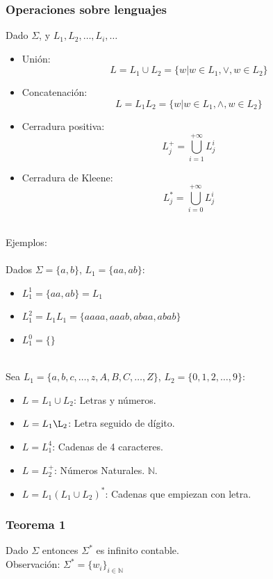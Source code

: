 \subsubsection{Operaciones sobre lenguajes}
Dado $\Sigma$, y $L_1, L_2, \dots, L_i, \dots$
\begin{itemize}
    \item Unión: 
    \begin{equation*}
        L = L_1\cup L_2 = \{w|w\in L_1, \lor, w\in L_2\}
    \end{equation*}
    \item Concatenación: 
    \begin{equation*}
        L = L_1 L_2 = \{w|w\in L_1, \land, w\in L_2\}
    \end{equation*}
    \item Cerradura positiva: 
    \begin{equation*}
        L^+_j = \bigcup^{+\infty}_{i=1}L^i_j
    \end{equation*}
    \item Cerradura de Kleene: 
    \begin{equation*}
        L^*_j = \bigcup^{+\infty}_{i=0}L^i_j
    \end{equation*}
\end{itemize}
\\
Ejemplos:\\\\
Dados $\Sigma = \{a, b\}$, $L_1 = \{aa, ab\}$:
\begin{itemize}
    \item $L^1_1 = \{aa, ab\} = L_1$
    \item $L^2_1 = L_1 L_1 = \{aaaa, aaab, abaa, abab\}$
    \item $L^0_1 = \{\}$
\end{itemize}
\\
Sea $L_1 = \{a,b,c,\dots,z,A,B,C,\dots,Z\}$, $L_2=\{0,1,2,\dots,9\}$:
\begin{itemize}
    \item $L=L_1 \cup L_2$: Letras y números.
    \item $L=L_1 \L_2$: Letra seguido de dígito.
    \item $L=L_1^4$: Cadenas de 4 caracteres.
    \item $L=L_2^+$: Números Naturales. $\mathbb{N}$.
    \item $L=L_1(L_1\cup L_2)^*$: Cadenas que empiezan con letra.
\end{itemize}

\subsubsection{Teorema 1}
Dado $\Sigma$ entonces $\Sigma^*$ es infinito contable.\\
Observación: $\Sigma^*=\{w_i\}_{i \in \mathbb{N}}$

